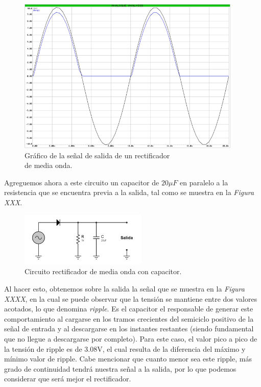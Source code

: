\documentclass{article}
\begin{document}
\newpage
\begin{figure}[h]
	\centering
	\includegraphics[width=0.95\textwidth]{images/4-4-2-grafico-circuito-rectificador-media-onda.jpg}
	\medskip
	\caption{Gráfico de la señal de salida de un rectificador\\ de media onda.}
\end{figure}
\bigskip\bigskip

	
	Agreguemos ahora a este circuito un capacitor de $20\mu F$ en paralelo a la resistencia que se encuentra previa a la salida, tal como se muestra en la \textit{Figura XXX}.
\bigskip


\begin{figure}[h]
	\centering
	\includegraphics[width=0.54\textwidth]{images/4-4-3-circuito-rectificador-media-onda-con-filtro.jpg}
	\medskip
	\caption{Circuito rectificador de media onda con capacitor.}
\end{figure}
\bigskip\bigskip


	Al hacer esto, obtenemos sobre la salida la señal que se muestra en la \textit{Figura XXXX}, en la cual se puede observar que la tensión se mantiene entre dos valores acotados, lo que denomina \textit{ripple}. Es el capacitor el responsable de generar este comportamiento al cargarse en los tramos crecientes del semiciclo positivo de la señal de entrada y al descargarse en los instantes restantes (siendo fundamental que no llegue a descargarse por completo). Para este caso, el valor pico a pico de la tensión de ripple es de 3.08V, el cual resulta de la diferencia del máximo y mínimo valor de ripple. Cabe mencionar que cuanto menor sea este ripple, más grado de continuidad tendrá nuestra señal a la salida, por lo que podemos considerar que será mejor el rectificador.
\bigskip
\end{document}
